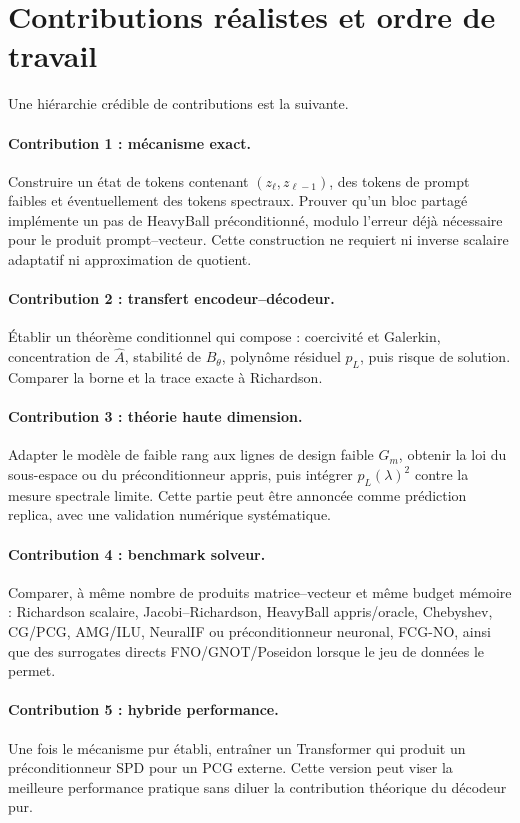 \documentclass[11pt,a4paper]{article}
\begin{document}
\section{Contributions réalistes et ordre de travail}

Une hiérarchie crédible de contributions est la suivante.

\paragraph{Contribution 1 : mécanisme exact.}
Construire un état de tokens contenant $(z_\ell,z_{\ell-1})$, des tokens de
prompt faibles et éventuellement des tokens spectraux. Prouver qu'un bloc
partagé implémente un pas de HeavyBall préconditionné, modulo l'erreur déjà
nécessaire pour le produit prompt--vecteur. Cette construction ne requiert ni
inverse scalaire adaptatif ni approximation de quotient.

\paragraph{Contribution 2 : transfert encodeur--décodeur.}
Établir un théorème conditionnel qui compose : coercivité et Galerkin,
concentration de $\widehat A$, stabilité de $B_\theta$, polynôme résiduel
$p_L$, puis risque de solution. Comparer la borne et la trace exacte à
Richardson.

\paragraph{Contribution 3 : théorie haute dimension.}
Adapter le modèle de faible rang aux lignes de design faible $G_m$, obtenir la
loi du sous-espace ou du préconditionneur appris, puis intégrer
$p_L(\lambda)^2$ contre la mesure spectrale limite. Cette partie peut être
annoncée comme prédiction replica, avec une validation numérique systématique.

\paragraph{Contribution 4 : benchmark solveur.}
Comparer, à même nombre de produits matrice--vecteur et même budget mémoire :
Richardson scalaire, Jacobi--Richardson, HeavyBall appris/oracle, Chebyshev,
CG/PCG, AMG/ILU, NeuralIF ou préconditionneur neuronal, FCG-NO, ainsi que des
surrogates directs FNO/GNOT/Poseidon lorsque le jeu de données le permet.

\paragraph{Contribution 5 : hybride performance.}
Une fois le mécanisme pur établi, entraîner un Transformer qui produit un
préconditionneur SPD pour un PCG externe. Cette version peut viser la meilleure
performance pratique sans diluer la contribution théorique du décodeur pur.
\end{document}
